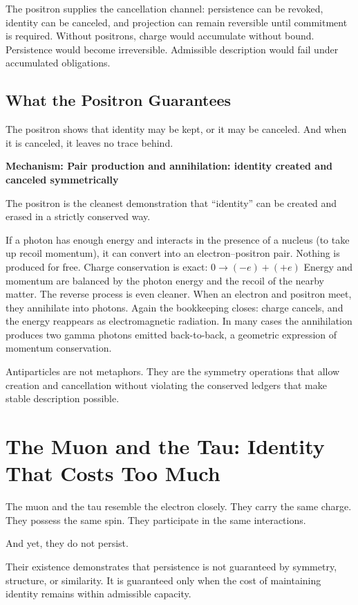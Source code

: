 \documentclass[11pt,twoside,openright]{book}
\newenvironment{mechanismbox}[1]
  {\begin{framed}\noindent\textbf{Mechanism: #1}\par\medskip}
  {\end{framed}}
\begin{document}
The positron supplies the cancellation channel: persistence can be revoked, identity can be canceled, and projection can remain reversible until commitment is required. Without positrons, charge would accumulate without bound. Persistence would become irreversible. Admissible description would fail under accumulated obligations.

\section*{What the Positron Guarantees}

The positron shows that identity may be kept, or it may be canceled. And when it is canceled, it leaves no trace behind.

\begin{mechanismbox}{Pair production and annihilation: identity created and canceled symmetrically}
The positron is the cleanest demonstration that ``identity'' can be created and erased in a strictly conserved way.

If a photon has enough energy and interacts in the presence of a nucleus (to take up recoil momentum), it can convert into an electron--positron pair. Nothing is produced for free. Charge conservation is exact: $0 \rightarrow (-e) + (+e)$ Energy and momentum are balanced by the photon energy and the recoil of the nearby matter. The reverse process is even cleaner. When an electron and positron meet, they annihilate into photons. Again the bookkeeping closes: charge cancels, and the energy reappears as electromagnetic radiation. In many cases the annihilation produces two gamma photons emitted back-to-back, a geometric expression of momentum conservation.

Antiparticles are not metaphors.
They are the symmetry operations that allow creation and cancellation without violating the conserved ledgers that make stable description possible.
\end{mechanismbox}
\chapter{The Muon and the Tau: Identity That Costs Too Much}

The muon and the tau resemble the electron closely. They carry the same charge. They possess the same spin. They participate in the same interactions.

And yet, they do not persist.

Their existence demonstrates that persistence is not guaranteed by symmetry, structure, or similarity. It is guaranteed only when the cost of maintaining identity remains within admissible capacity.
\end{document}
